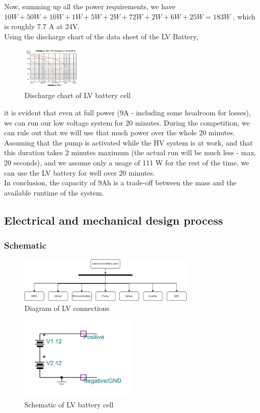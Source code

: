Now, summing up all the power requirements, we have
\(10W + 50W + 10W + 1W + 5W + 2W + 72W + 2W + 6W + 25W = 183W \) , which is roughly 7.7 A at 24V. \\
Using the discharge chart of the data sheet of the LV Battery,
\begin{figure}
    \centering
    \includegraphics[width=0.25\textwidth]{texfiles/elec/eimg/LV_Battery_WP1236W}
    \caption{Discharge chart of LV battery cell}
\end{figure}
it is evident that even at full power (9A - including some headroom for losses), we can run our low voltage system for 20 minutes. During the competition, we can rule out that we will use that much power over the whole 20 minutes. 
Assuming that the pump is activated while the HV system is at work, and that this duration takes 2 minutes maximum (the actual run will be much less - max. 20 seconds), and we assume only a usage of 111 W for the rest of the time,
we can use the LV battery for well over 20 minutes. \\
In conclusion, the capacity of 9Ah is a trade-off between the mass and the available runtime of the system.
\subsection{Electrical and mechanical design process}
\subsubsection{Schematic}
\begin{figure}[h]
    \centering
    \includegraphics[width=0.75\textwidth]{texfiles/elec/eimg/LV_Diagram}
    \caption{Diagram of LV connections}
\end{figure}
\begin{figure}[h]
    \centering
    \includegraphics[width=0.5\textwidth]{texfiles/elec/eimg/LVCircuit}
    \caption{Schematic of LV battery cell}
\end{figure}
